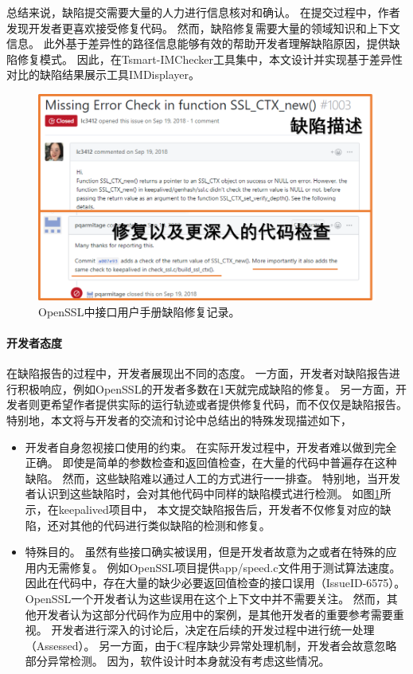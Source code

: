 总结来说，缺陷提交需要大量的人力进行信息核对和确认。
在提交过程中，作者发现开发者更喜欢接受修复代码。
然而，缺陷修复需要大量的领域知识和上下文信息。
此外基于差异性的路径信息能够有效的帮助开发者理解缺陷原因，提供缺陷修复模式。
因此，在Tsmart-IMChecker工具集中，本文设计并实现基于差异性对比的缺陷结果展示工具IMDisplayer。

\begin{figure}[t]
	\centering
	\includegraphics[width=0.8\linewidth]{figures/cp4-keepalived-fix.png}
	\caption{
		OpenSSL中接口用户手册缺陷修复记录。
	}
	\label{fig:4-4-keepalived-fix}
\end{figure}

\paragraph{开发者态度}
在缺陷报告的过程中，开发者展现出不同的态度。
一方面，开发者对缺陷报告进行积极响应，例如OpenSSL的开发者多数在1天就完成缺陷的修复。
另一方面，开发者则更希望作者提供实际的运行轨迹或者提供修复代码，而不仅仅是缺陷报告。
特别地，本文将与开发者的交流和讨论中总结出的特殊发现描述如下，
\begin{itemize}
	\item 开发者自身忽视接口使用的约束。
	在实际开发过程中，开发者难以做到完全正确。
	即使是简单的参数检查和返回值检查，在大量的代码中普遍存在这种缺陷。
	然而，这些缺陷难以通过人工的方式进行一一排查。
	特别地，当开发者认识到这些缺陷时，会对其他代码中同样的缺陷模式进行检测。
	如图\ref{fig:4-4-keepalived-fix}所示，在keepalived项目中，
	本文提交缺陷报告后，开发者不仅修复对应的缺陷，还对其他的代码进行类似缺陷的检测和修复。
	\item 特殊目的。
	虽然有些接口确实被误用，但是开发者故意为之或者在特殊的应用内无需修复。
	例如OpenSSL项目提供app/speed.c文件用于测试算法速度。
	因此在代码中，存在大量的缺少必要返回值检查的接口误用（IssueID-6575）。
	OpenSSL一个开发者认为这些误用在这个上下文中并不需要关注。
	然而，其他开发者认为这部分代码作为应用中的案例，是其他开发者的重要参考需要重视。
	开发者进行深入的讨论后，决定在后续的开发过程中进行统一处理（Assessed）。
	另一方面，由于C程序缺少异常处理机制，开发者会故意忽略部分异常检测。
	因为，软件设计时本身就没有考虑这些情况。
\end{itemize}

